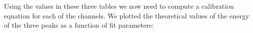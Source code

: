 \documentclass{article}
\begin{document}
\begin{multicols}{2}
%

Using the values in these three tables we now need to compute a calibration equation for each of the channels.
We plotted the theoretical values of the energy of the three peaks as a function of fit parameters:


\end{multicols}
\end{document}
